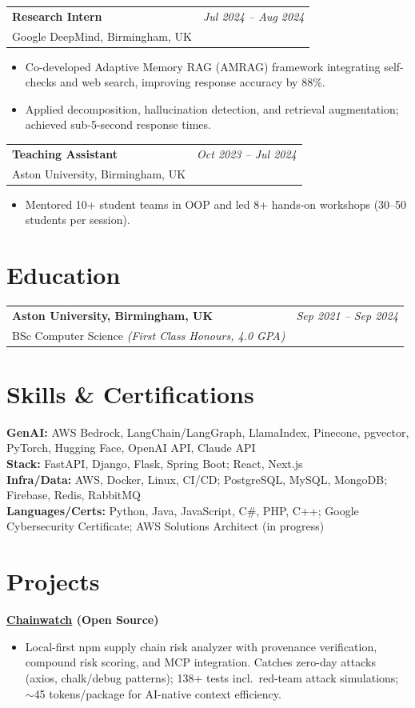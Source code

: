 \documentclass[10pt,a4paper]{article}
\makeatletter
\newcommand{\cventry}[4]{%
  \begin{tabular*}{\textwidth}{@{}l@{\extracolsep{\fill}}r@{}}
    \textbf{#1} & \textit{#2} \\
    #3 & \textit{#4} \\
  \end{tabular*}\vspace{1pt}
}
\newcommand{\cventryone}[3]{%
  \begin{tabular*}{\textwidth}{@{}l@{\extracolsep{\fill}}r@{}}
    \textbf{#1} & \textit{#2} \\
    #3 & \\
  \end{tabular*}\vspace{1pt}
}
\newcommand{\cvproject}[2]{\textbf{#1} \hfill \textit{#2}\vspace{1pt}}
\newcommand{\smallgap}{\vspace{1pt}}
\makeatother
\begin{document}
\cventry{Research Intern}{Jul 2024 -- Aug 2024}{Google DeepMind, Birmingham, UK}{}
\begin{itemize}
  \item Co-developed Adaptive Memory RAG (AMRAG) framework integrating self-checks and web search, improving response accuracy by 88\%.
  \item Applied decomposition, hallucination detection, and retrieval augmentation; achieved sub-5-second response times.
\end{itemize}
\smallgap

\cventry{Teaching Assistant}{Oct 2023 -- Jul 2024}{Aston University, Birmingham, UK}{}
\begin{itemize}
  \item Mentored 10+ student teams in OOP and led 8+ hands-on workshops (30--50 students per session).
\end{itemize}

\section{Education}

\cventryone{Aston University, Birmingham, UK}{Sep 2021 -- Sep 2024}{BSc Computer Science \;\textit{(First Class Honours, 4.0 GPA)}}%

\section{Skills \& Certifications}

\textbf{GenAI:} AWS Bedrock, LangChain/LangGraph, LlamaIndex, Pinecone, pgvector, PyTorch, Hugging Face, OpenAI API, Claude API \\
\textbf{Stack:} FastAPI, Django, Flask, Spring Boot; React, Next.js \\
\textbf{Infra/Data:} AWS, Docker, Linux, CI/CD; PostgreSQL, MySQL, MongoDB; Firebase, Redis, RabbitMQ \\
\textbf{Languages/Certs:} Python, Java, JavaScript, C\#, PHP, C++; Google Cybersecurity Certificate; AWS Solutions Architect (in progress)

\section{Projects}

\cvproject{\href{https://watchman-rust.vercel.app/}{Chainwatch} (Open Source)}{}
\begin{itemize}
  \item Local-first npm supply chain risk analyzer with provenance verification, compound risk scoring, and MCP integration. Catches zero-day attacks (axios, chalk/debug patterns); 138+ tests incl.\ red-team attack simulations; \(\sim\)45 tokens/package for AI-native context efficiency.
\end{itemize}
\smallgap
\end{document}
